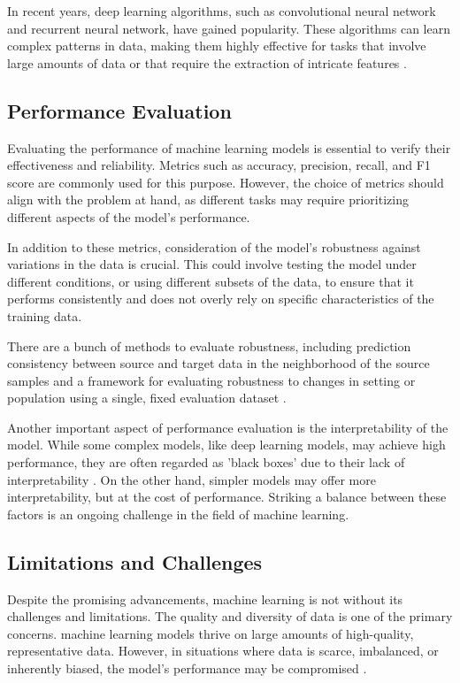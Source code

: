 In recent years, deep learning algorithms, such as convolutional neural network and recurrent neural network, have gained popularity. These algorithms can learn complex patterns in data, making them highly effective for tasks that involve large amounts of data or that require the extraction of intricate features \parencite{Pamina2019SurveyOD}.

\newpage
\subsection{Performance Evaluation}
Evaluating the performance of machine learning models is essential to verify their effectiveness and reliability. Metrics such as accuracy, precision, recall, and F1 score are commonly used for this purpose. However, the choice of metrics should align with the problem at hand, as different tasks may require prioritizing different aspects of the model's performance.

In addition to these metrics, consideration of the model's robustness against variations in the data is crucial. This could involve testing the model under different conditions, or using different subsets of the data, to ensure that it performs consistently and does not overly rely on specific characteristics of the training data. 

There are a bunch of methods to evaluate robustness, including prediction consistency between source and target data in the neighborhood of the source samples \parencite{Shi2019} and a framework for evaluating robustness to changes in setting or population using a single, fixed evaluation dataset \parencite{Subbaswamy2020EvaluatingMR}.

Another important aspect of performance evaluation is the interpretability of the model. While some complex models, like deep learning models, may achieve high performance, they are often regarded as 'black boxes' due to their lack of interpretability \parencite{Zhang2018}. On the other hand, simpler models may offer more interpretability, but at the cost of performance. Striking a balance between these factors is an ongoing challenge in the field of machine learning.

\newpage
\subsection{Limitations and Challenges}
Despite the promising advancements, machine learning is not without its challenges and limitations. The quality and diversity of data is one of the primary concerns. machine learning models thrive on large amounts of high-quality, representative data. However, in situations where data is scarce, imbalanced, or inherently biased, the model's performance may be compromised \parencite{Lum2017}.

